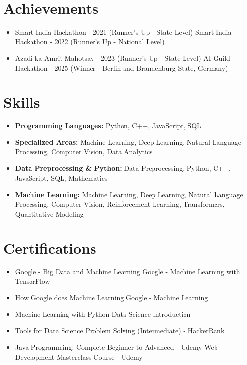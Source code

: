 \documentclass[a4paper,10pt]{article}
\begin{document}
\section*{Achievements}
\begin{itemize}
\item Smart India Hackathon - 2021 (Runner's Up - State Level) \hfill Smart India Hackathon - 2022 (Runner's Up - National Level)
\item Azadi ka Amrit Mahotsav - 2023 (Runner's Up - State Level) \hfill AI Guild Hackathon - 2025 (Winner - Berlin and Brandenburg State, Germany)
\end{itemize}

\section*{Skills}
\begin{itemize}
  \item \textbf{Programming Languages:} Python, C++, JavaScript, SQL
  \item \textbf{Specialized Areas:} Machine Learning, Deep Learning, Natural Language Processing, Computer Vision, Data Analytics
  \item \textbf{Data Preprocessing \& Python:} Data Preprocessing, Python, C++, JavaScript, SQL, Mathematics
  \item \textbf{Machine Learning:} Machine Learning, Deep Learning, Natural Language Processing, Computer Vision, Reinforcement Learning, Transformers, Quantitative Modeling
\end{itemize}

\section*{Certifications}
\begin{itemize}
\item Google - Big Data and Machine Learning \hfill Google - Machine Learning with TensorFlow
\item How Google does Machine Learning \hfill Google - Machine Learning
\item Machine Learning with Python \hfill Data Science Introduction
\item Tools for Data Science \hfill Problem Solving (Intermediate) - HackerRank
\item Java Programming: Complete Beginner to Advanced - Udemy \hfill Web Development Masterclass Course - Udemy
\end{itemize}
\end{document}
